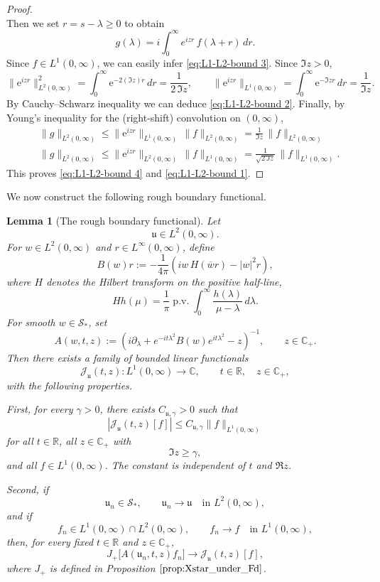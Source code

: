 \documentclass[10pt]{article}
\newtheorem{lemma}[theorem]{Lemma}
\numberwithin{equation}{section}
\numberwithin{theorem}{section}
\begin{document}
\begin{appendix}
\begin{proof}
\[\]
Then we set $r=s-\lambda\ge 0$ to obtain
\[
g(\lambda)= i\int_0^\infty e^{iz r}\,f(\lambda+r)\,dr.
\]
Since $f \in L^1(0,\infty)$, we can easily infer \eqref{eq:L1-L2-bound 3}. Since $\Im z>0$,
\[
\|\mathrm{e}^{iz r}\|_{L^2(0,\infty)}^2
=\int_0^\infty \mathrm{e}^{-2(\Im z) r}\,dr
=\frac{1}{2\,\Im z}, \qquad \|\mathrm{e}^{iz r}\|_{L^1(0,\infty)}
=\int_0^\infty \mathrm{e}^{-\Im z r}\,dr
=\frac{1}{\Im z}.
\]
By Cauchy--Schwarz inequality we can deduce \eqref{eq:L1-L2-bound 2}. Finally, by Young's inequality for the (right-shift)
convolution on $(0,\infty)$,
\begin{align*}
&\|g\|_{L^2(0,\infty)}
\le \|\mathrm{e}^{iz r}\|_{L^1(0,\infty)}\,\|f\|_{L^2(0,\infty)}
= \frac{1}{\Im z}\,\|f\|_{L^2(0,\infty)} \\
&\|g\|_{L^2(0,\infty)}
\le \|\mathrm{e}^{iz r}\|_{L^2(0,\infty)}\,\|f\|_{L^1(0,\infty)}
= \frac{1}{\sqrt{2\,\Im z}}\,\|f\|_{L^1(0,\infty)}.
\end{align*}
This proves \eqref{eq:L1-L2-bound 4} and \eqref{eq:L1-L2-bound 1}.
\end{proof}
We now construct the following rough boundary functional.

\begin{lemma}[The rough boundary functional]
\label{coro a.7}
Let
\[
\mathfrak u\in L^2(0,\infty).
\]
For \(w\in L^2(0,\infty)\) and \(r\in L^\infty(0,\infty)\), define
\[
B(w)r
:=
-\frac1{4\pi}
\left(
iw\,H(\overline w r)-|w|^2r
\right),
\]
where \(H\) denotes the Hilbert transform on the positive half-line,
\[
Hh(\mu)
=
\frac1\pi\operatorname{p.v.}
\int_0^\infty
\frac{h(\lambda)}{\mu-\lambda}\,d\lambda .
\]
For smooth \(w\in\mathcal S_*\), set
\[
A(w,t,z)
:=
\left(
i\partial_\lambda
+
e^{-it\lambda^2}B(w)e^{it\lambda^2}
-z
\right)^{-1},
\qquad z\in\mathbb C_+ .
\]
Then there exists a family of bounded linear functionals
\[
\mathcal J_{\mathfrak u}(t,z):L^1(0,\infty)\to\mathbb C,
\qquad t\in\mathbb R,\quad z\in\mathbb C_+,
\]
with the following properties.

First, for every \(\gamma>0\), there exists \(C_{\mathfrak u,\gamma}>0\) such that
\begin{equation}
\label{A7-boundary-L1-bound}
|\mathcal J_{\mathfrak u}(t,z)[f]|
\le
C_{\mathfrak u,\gamma}\|f\|_{L^1(0,\infty)}
\end{equation}
for all \(t\in\mathbb R\), all \(z\in\mathbb C_+\) with
\[
\Im z\ge\gamma,
\]
and all \(f\in L^1(0,\infty)\). The constant is independent of \(t\) and
\(\Re z\).

Second, if
\[
\mathfrak u_n\in \mathcal S_*,
\qquad
\mathfrak u_n\to\mathfrak u
\quad\text{in }L^2(0,\infty),
\]
and if
\[
f_n\in L^1(0,\infty)\cap L^2(0,\infty),
\qquad
f_n\to f
\quad\text{in }L^1(0,\infty),
\]
then, for every fixed \(t\in\mathbb R\) and \(z\in\mathbb C_+\),
\begin{equation}
\label{A7-boundary-approx-conv}
J_+\bigl[A(\mathfrak u_n,t,z)f_n\bigr]
\longrightarrow
\mathcal J_{\mathfrak u}(t,z)[f],
\end{equation}
where \(J_+\) is defined in Proposition \(\ref{prop:Xstar_under_Fd}\).


\end{lemma}
\end{appendix}
\end{document}
